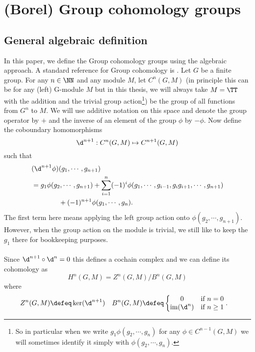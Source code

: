 \section{(Borel) Group cohomology groups}
\subsection{General algebraic definition}\label{sec:general-algebraic-definition}
In this paper, we define the Group cohomology groups using the algebraic approach. A standard reference for Group cohomology is \cite{benson1991representations}. Let $G$ be a finite group. For any $n\in\NN$ and any module $M$, let $C^n(G,M)$ (in principle this can be for any (left) G-module $M$ but in this thesis, we will always take $M=\TT$ with the addition and the trivial group action\footnote{So in particular when we write $g_1 \phi(g_2,\cdots,g_n)$ for any $\phi\in C^{n-1}(G,M)$ we will sometimes identify it simply with $\phi(g_2,\cdots,g_n)$.}) be the group of all functions from $G^n$ to $M$. We will use additive notation on this space and denote the group operator by $+$ and the inverse of an element of the group $\phi$ by $-\phi$. Now define the coboundary homomorphisms
\begin{equation}
\d^{n+1}:C^n(G,M)\mapsto C^{n+1}(G,M)
\end{equation}
such that
\begin{align}
&(\d^{n+1}\phi)(g_1,\cdots,g_{n+1})\\
\nonumber
&=g_1\phi(g_2,\cdots,g_{n+1})+\sum_{i=1}^n (-1)^i \phi(g_1,\cdots,g_{i-1},g_{i}g_{i+1},\cdots,g_{n+1})\\
\nonumber
&\qquad\qquad+(-1)^{n+1}\phi(g_1,\cdots,g_n).
\end{align}
The first term here means applying the left group action onto $\phi(g_2,\cdots,g_{n+1})$. However, when the group action on the module is trivial, we still like to keep the $g_1$ there for bookkeeping purposes.\\\\
Since $\d^{n+1}\circ\d^{n}=0$ this defines a cochain complex and we can define its cohomology as
\begin{equation}
H^n(G,M)=Z^n(G,M)/B^n(G,M)
\end{equation}
where
\begin{align}
Z^n(G,M)&\defeq \ker(\d^{n+1})&B^n(G,M)&\defeq \left\{\begin{matrix}
0&\text{if }n=0\\\textrm{im}(\d^n)&\text{if }n\geq 1
\end{matrix}\right. .
\end{align}
